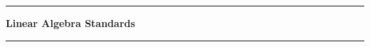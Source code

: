 \documentclass[letterpaper]{article}
\newcommand{\module}{?}
\newcommand{\setModule}[1]{\renewcommand{\module}{#1}}
\begin{document}
\pagestyle{empty}
\vspace{0.3in}
\hrule
\begin{center}\large \textbf{Linear Algebra Standards}\end{center}
\hrule
\vspace{0.1in}

\setModule{E}

\setModule{V}

\setModule{A}

\setModule{M}

\setModule{G}

\end{document}
